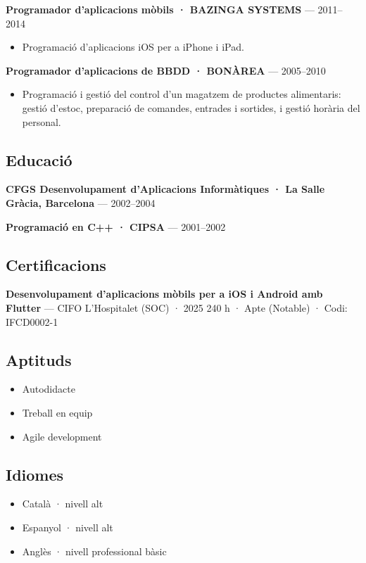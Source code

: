 \documentclass[
  11pt,
  a4paper]{article}
\providecommand{\tightlist}{%
  \setlength{\itemsep}{0pt}\setlength{\parskip}{0pt}}
\begin{document}
\textbf{Programador d'aplicacions mòbils · BAZINGA SYSTEMS} ---
2011--2014

\begin{itemize}
\tightlist
\item
  Programació d'aplicacions iOS per a iPhone i iPad.
\end{itemize}

\textbf{Programador d'aplicacions de BBDD · BONÀREA} --- 2005--2010

\begin{itemize}
\tightlist
\item
  Programació i gestió del control d'un magatzem de productes
  alimentaris: gestió d'estoc, preparació de comandes, entrades i
  sortides, i gestió horària del personal.
\end{itemize}

\subsection{Educació}\label{educaciuxf3}

\textbf{CFGS Desenvolupament d'Aplicacions Informàtiques · La Salle
Gràcia, Barcelona} --- 2002--2004

\textbf{Programació en C++ · CIPSA} --- 2001--2002

\subsection{Certificacions}\label{certificacions}

\textbf{Desenvolupament d'aplicacions mòbils per a iOS i Android amb
Flutter} --- CIFO L'Hospitalet (SOC) · 2025 240 h · Apte (Notable) ·
Codi: IFCD0002-1

\subsection{Aptituds}\label{aptituds}

\begin{itemize}
\tightlist
\item
  Autodidacte
\item
  Treball en equip
\item
  Agile development
\end{itemize}

\subsection{Idiomes}\label{idiomes}

\begin{itemize}
\tightlist
\item
  Català · nivell alt
\item
  Espanyol · nivell alt
\item
  Anglès · nivell professional bàsic
\end{itemize}
\end{document}
